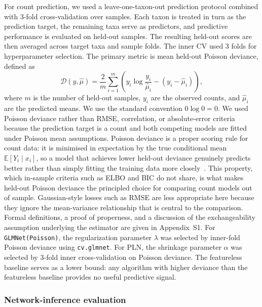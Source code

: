 \documentclass[Review,doublespace,sageh,times]{sagej}
\begin{document}
For count prediction, we used a leave-one-taxon-out prediction protocol combined with 3-fold cross-validation over samples.
Each taxon is treated in turn as the prediction target, the remaining taxa serve as predictors, and predictive performance is evaluated on held-out samples.
The resulting held-out scores are then averaged across target taxa and sample folds.
The inner CV used 3 folds for hyperparameter selection.
The primary metric is mean held-out Poisson deviance, defined as
\[
  \mathcal{D}(y, \hat\mu) = \frac{2}{m}\sum_{i=1}^{m} \left( y_i \log\frac{y_i}{\hat\mu_i} - (y_i - \hat\mu_i) \right),
\]
where $m$ is the number of held-out samples, $y_i$ are the observed counts, and $\hat\mu_i$ are the predicted means.
We use the standard convention $0 \log 0 = 0$.
We used Poisson deviance rather than RMSE, correlation, or absolute-error criteria because the prediction target is a count and both competing models are fitted under Poisson mean assumptions.
Poisson deviance is a proper scoring rule for count data: it is minimised in expectation by the true conditional mean $\mathbb{E}[Y_i \mid x_i]$, so a model that achieves lower held-out deviance genuinely predicts better rather than simply fitting the training data more closely~\citep{Gneiting2007ProperScoring}.
This property, which in-sample criteria such as ELBO and BIC do not share, is what makes held-out Poisson deviance the principled choice for comparing count models out of sample.
Gaussian-style losses such as RMSE are less appropriate here because they ignore the mean-variance relationship that is central to the comparison.
Formal definitions, a proof of properness, and a discussion of the exchangeability assumption underlying the estimator are given in Appendix~S1.
For \texttt{GLMNet(Poisson)}, the regularization parameter $\lambda$ was selected by inner-fold Poisson deviance using \texttt{cv.glmnet}.
For PLN, the shrinkage parameter $\alpha$ was selected by 3-fold inner cross-validation on Poisson deviance.
The featureless baseline serves as a lower bound: any algorithm with higher deviance than the featureless baseline provides no useful predictive signal.

\subsubsection{Network-inference evaluation}
\end{document}
